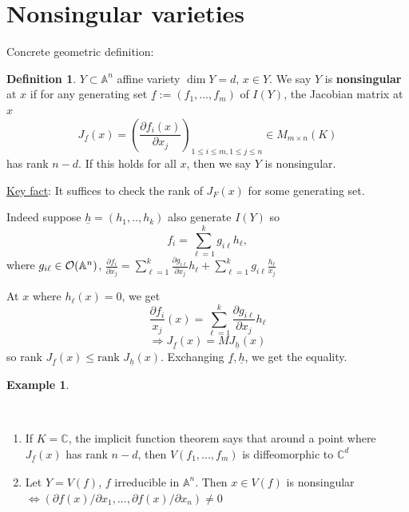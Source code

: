 \documentclass[11pt]{article}
\theoremstyle{definition}
\newtheorem{dfn}[thm]{Definition}
\newtheorem{ex}[thm]{Example}
\newcommand{\affn}{\mathbb A}
\newcommand{\cplx}{\mathbb C}
\newcommand{\calo}{{\cal O}}
\newcommand{\pd}{\partial}
\newcommand{\Lrta}{\Longrightarrow}
\newcommand{\Llrta}{\Longleftrightarrow}
\begin{document}
\section*{Nonsingular varieties}
Concrete geometric definition:
\begin{dfn}
$Y\subset \affn^n$ affine variety $\dim Y=d$, $x\in Y$. We say $Y$ is \textbf{nonsingular} at $x$ if for any generating set $\underline{f}:=(f_1,...,f_m)$ of $I(Y)$, the Jacobian matrix at $x$
$$
J_{\underline{f}}(x)=\left(\frac{\pd f_i(x)}{\pd x_j}\right)_{1\leq i\leq m, 1\leq j \leq n}\in M_{m\times n}(K)
$$
has rank $n-d$. If this holds for all $x$, then we say $Y$ is nonsingular.
\end{dfn}
\underline{Key fact}: It suffices to check the rank of $J_F(x)$ for some generating set. 

Indeed suppose $\underline{h}=(h_1,..,h_k)$ also generate $I(Y)$ so
$$
f_i = \sum^k_{\ell=1} g_{i\ell} h_\ell,
$$
where $g_{i\ell}\in \calo(\affn^n)$, $\frac{\pd f_i}{\pd x_j}=\sum^k_{\ell=1}\frac{\pd g_{i\ell}}{\pd x_j}h_\ell+\sum^k_{\ell=1}g_{i\ell}\frac{h_\ell}{x_j}$

At $x$ where $h_\ell(x)=0$, we get 
$$
\frac{\pd f_i}{x_j}(x)=\sum^k_{\ell=1}\frac{\pd g_{i\ell}}{\pd x_j}h_\ell
$$
$$
\Lrta J_{\underline{f}}(x)=M J_{\underline{h}}(x)
$$
so rank $J_{\underline{f}}(x)\leq \text{rank } J_{\underline{h}}(x)$. Exchanging $\underline{f},\underline{h}$, we get the equality.

\begin{ex}

\end{ex}\ 
\begin{enumerate}[label=(\arabic*)]
\item If $K=\cplx$, the implicit function theorem says that around a point where $J_{\underline{f}}(x)$ has rank $n-d$, then $V(f_1,...,f_m)$ is diffeomorphic to $\cplx^d$
\item Let $Y=V(f)$, $f$ irreducible in $\affn^n$. Then $x\in V(f)$ is nonsingular
$\Llrta(\pd f(x)/\pd x_1,...,\pd f(x)/\pd x_n)\neq 0$
\end{enumerate}
\end{document}
